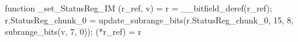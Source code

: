 function _set_StatusReg_IM (r_ref, v) = {
    r = __bitfield_deref(r_ref);
    r.StatusReg_chunk_0 = update_subrange_bits(r.StatusReg_chunk_0, 15, 8, subrange_bits(v, 7, 0));
    (*r_ref) = r
}
